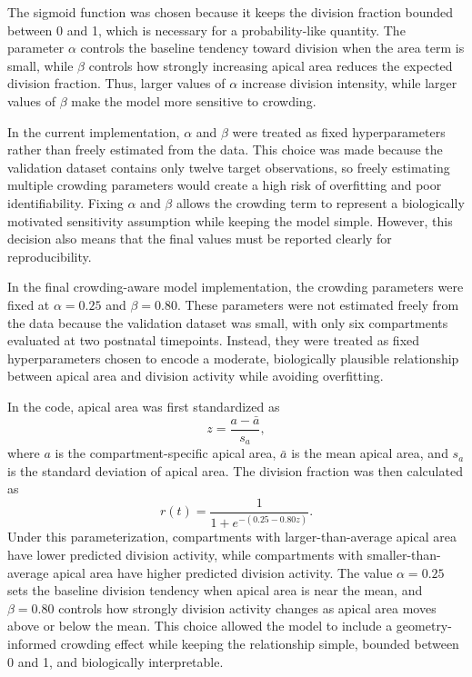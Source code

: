 \documentclass[12pt]{article}
\begin{document}
The sigmoid function was chosen because it keeps the division fraction bounded between 0 and 1, which is necessary for a probability-like quantity. The parameter $\alpha$ controls the baseline tendency toward division when the area term is small, while $\beta$ controls how strongly increasing apical area reduces the expected division fraction. Thus, larger values of $\alpha$ increase division intensity, while larger values of $\beta$ make the model more sensitive to crowding.

In the current implementation, $\alpha$ and $\beta$ were treated as fixed hyperparameters rather than freely estimated from the data. This choice was made because the validation dataset contains only twelve target observations, so freely estimating multiple crowding parameters would create a high risk of overfitting and poor identifiability. Fixing $\alpha$ and $\beta$ allows the crowding term to represent a biologically motivated sensitivity assumption while keeping the model simple. However, this decision also means that the final values must be reported clearly for reproducibility.

In the final crowding-aware model implementation, the crowding parameters were fixed at $\alpha = 0.25$ and $\beta = 0.80$. These parameters were not estimated freely from the data because the validation dataset was small, with only six compartments evaluated at two postnatal timepoints. Instead, they were treated as fixed hyperparameters chosen to encode a moderate, biologically plausible relationship between apical area and division activity while avoiding overfitting.

In the code, apical area was first standardized as
\[
z = \frac{a - \bar{a}}{s_a},
\]
where $a$ is the compartment-specific apical area, $\bar{a}$ is the mean apical area, and $s_a$ is the standard deviation of apical area. The division fraction was then calculated as
\[
r(t)=\frac{1}{1+e^{-(0.25-0.80z)}}.
\]
Under this parameterization, compartments with larger-than-average apical area have lower predicted division activity, while compartments with smaller-than-average apical area have higher predicted division activity. The value $\alpha=0.25$ sets the baseline division tendency when apical area is near the mean, and $\beta=0.80$ controls how strongly division activity changes as apical area moves above or below the mean. This choice allowed the model to include a geometry-informed crowding effect while keeping the relationship simple, bounded between 0 and 1, and biologically interpretable.
\end{document}
